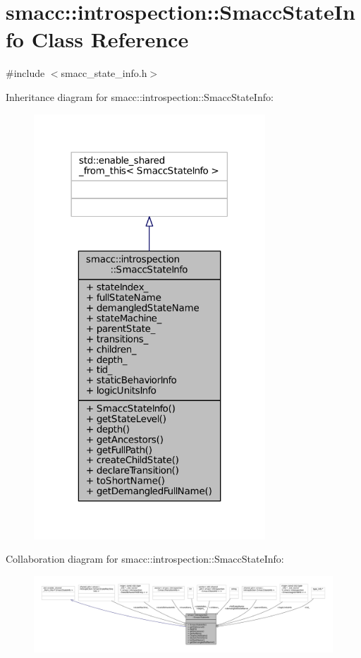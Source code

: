 \hypertarget{classsmacc_1_1introspection_1_1SmaccStateInfo}{}\section{smacc\+:\+:introspection\+:\+:Smacc\+State\+Info Class Reference}
\label{classsmacc_1_1introspection_1_1SmaccStateInfo}


{\ttfamily \#include $<$smacc\+\_\+state\+\_\+info.\+h$>$}



Inheritance diagram for smacc\+:\+:introspection\+:\+:Smacc\+State\+Info\+:
\nopagebreak
\begin{figure}[H]
\begin{center}
\leavevmode
\includegraphics[width=246pt]{classsmacc_1_1introspection_1_1SmaccStateInfo__inherit__graph}
\end{center}
\end{figure}


Collaboration diagram for smacc\+:\+:introspection\+:\+:Smacc\+State\+Info\+:
\nopagebreak
\begin{figure}[H]
\begin{center}
\leavevmode
\includegraphics[width=350pt]{classsmacc_1_1introspection_1_1SmaccStateInfo__coll__graph}
\end{center}
\end{figure}
